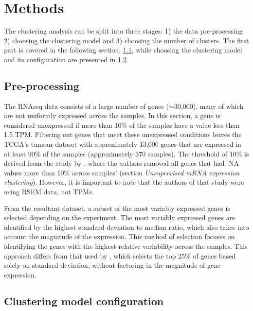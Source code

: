 \section{Methods} \label{s:cs:methods}



The clustering analysis can be split into three stages: 1) the data pre-processing 2) choosing the clustering model and 3) choosing the number of clusters. The first part is covered in the following section, \ref{s:cs:pre-processing}, while choosing the clustering model and its configuration are presented in \cref{s:cs:right_config}.


\subsection{Pre-processing} \label{s:cs:pre-processing}

The RNAseq data consists of a large number of genes ($\sim$30,000), many of which are not uniformly expressed across the samples. In this section, a gene is considered unexpressed if more than 10\% of the samples have a value less than 1.5 TPM. Filtering out genes that meet these unexpressed conditions leaves the TCGA's tumour dataset with approximately 13,000 genes that are expressed in at least 90\% of the samples (approximately 370 samples). The threshold of 10\% is derived from the study by \citet{Robertson2017-mg}, where the authors removed all genes that had 'NA values more than 10\% across samples' (section \textit{Unsupervised mRNA expression clustering}). However, it is important to note that the authors of that study were using RSEM data, not TPMs.

From the resultant dataset, a subset of the most variably expressed genes is selected depending on the experiment. The most variably expressed genes are identified by the highest standard deviation to median ratio, which also takes into account the magnitude of the expression. This method of selection focuses on identifying the genes with the highest relative variability across the samples. This approach differs from that used by \citet{Robertson2017-mg}, which selects the top 25\% of genes based solely on standard deviation, without factoring in the magnitude of gene expression.


\subsection{Clustering model configuration} \label{s:cs:right_config}

